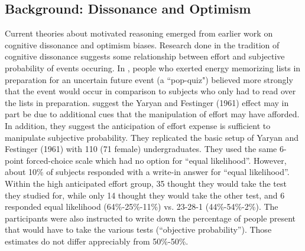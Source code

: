 \documentclass{article}
\begin{document}
\subsection{Background: Dissonance and Optimism}
Current theories about motivated reasoning emerged from earlier work on cognitive dissonance and optimism biases. Research done in the tradition of cognitive dissonance suggests some relationship between effort and subjective probability of events occuring. In \citet{Yaryan1961}, people who exerted energy memorizing lists in preparation for an uncertain future event (a ``pop-quiz") believed more strongly that the event would occur in comparison to subjects who only had to read over the lists in preparation. \citet{Arrowood1966} suggest the Yaryan and Festinger (1961) effect may in part be due to additional cues that the manipulation of effort may have afforded. In addition, they suggest the anticipation of effort expense is sufficient to manipulate subjective probability. They replicated the basic setup of Yaryan and Festinger (1961) with 110 (71 female) undergraduates. They used the same 6-point forced-choice scale which had no option for ``equal likelihood''. However, about 10\% of subjects responded with a write-in answer for ``equal likelihood''. Within the high anticipated effort group, 35 thought they would take the test they studied for, while only 14 thought they would take the other test, and 6 responded equal likelihood (64\%-25\%-11\%) vs. 23-28-1 (44\%-54\%-2\%). The participants were also instructed to write down the percentage of people present that would have to take the various tests (``objective probability''). Those estimates do not differ appreciably from 50\%-50\%. 
\end{document}
